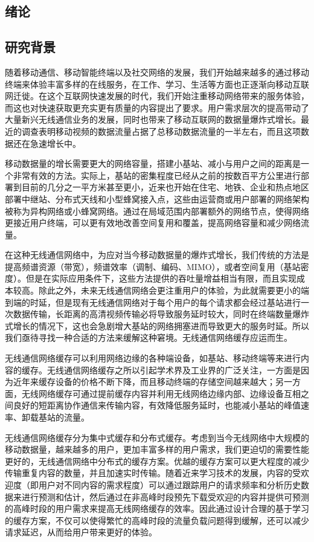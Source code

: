 \documentclass[bachelor]{seuthesis} %
\begin{document}
\begin{Main} %

\chapter{绪论}
\section{研究背景}
随着移动通信、移动智能终端以及社交网络的发展，我们开始越来越多的通过移动终端来体验丰富多样的在线服务，在工作、学习、生活等方面也正逐渐向移动互联网迁徙。在这个互联网快速发展的时代，我们开始注重移动网络带来的服务体验，而这也对快速获取更充实更有质量的内容提出了要求。用户需求层次的提高带动了大量新兴无线通信业务的发展，同时也带来了移动互联网的数据量爆炸式增长。最近的调查表明移动视频的数据流量占据了总移动数据流量的一半左右\cite{cisco2014global}，而且这项数据还在急速增长中。\par
移动数据量的增长需要更大的网络容量，搭建小基站、减小与用户之间的距离是一个非常有效的方法。实际上，基站的密集程度已经从之前的按数百平方公里进行部署到目前的几分之一平方米甚至更小，近来也开始在住宅、地铁、企业和热点地区部署中继站、分布式天线和小型蜂窝接入点，这些由运营商或用户部署的网络架构被称为异构网络或小蜂窝网络。通过在局域范围内部署额外的网络节点，使得网络更接近用户终端，可以更有效地改善空间复用和覆盖，提高网络容量和减少网络流量。\par
在这种无线通信网络中，为应对当今移动数据量的爆炸式增长，我们传统的方法是提高频谱资源（带宽），频谱效率（调制、编码、MIMO），或者空间复用（基站密度）。但是在实际应用条件下，这些方法提供的吞吐量增益相当有限，而且实现成本较高。除此之外，未来无线通信网络会更注重用户的体验，为此就需要更小的端到端的时延，但是现有无线通信网络对于每个用户的每个请求都会经过基站进行一次数据传输，长距离的高清视频传输必将导致服务延时较大，同时在终端数量爆炸式增长的情况下，这也会急剧增大基站的网络拥塞进而导致更大的服务时延。所以我们亟待寻找一种合适的方法来缓解这种窘境。无线通信网络缓存应运而生。\par
无线通信网络缓存可以利用网络边缘的各种端设备，如基站、移动终端等来进行内容的缓存。无线通信网络缓存之所以引起学术界及工业界的广泛关注，一方面是因为近年来缓存设备的价格不断下降，而且移动终端的存储空间越来越大；另一方面，无线网络缓存可通过提前缓存内容并利用无线网络边缘内部、边缘设备互相之间良好的短距离协作通信来传输内容，有效降低服务延时，也能减小基站的峰值速率、卸载基站的流量。\par
无线通信网络缓存分为集中式缓存和分布式缓存。考虑到当今无线网络中大规模的移动数据量，越来越多的用户，更加丰富多样的用户需求，我们更迫切的需要性能更好的，无线通信网络中分布式的缓存方案。优越的缓存方案可以更大程度的减少传输重复内容的数量，并且加速实时传输。随着近来学习技术的发展，内容的受欢迎度（即用户对不同内容的需求程度）可以通过跟踪用户的请求频率和分析历史数据来进行预测和估计，然后通过在非高峰时段预先下载受欢迎的内容并提供可预测的高峰时段的用户需求来提高无线网络缓存的效率。因此通过设计合理的基于学习的缓存方案，不仅可以使得繁忙的高峰时段的流量负载问题得到缓解，还可以减少请求延迟，从而给用户带来更好的体验。\par

\end{Main}
\end{document}
